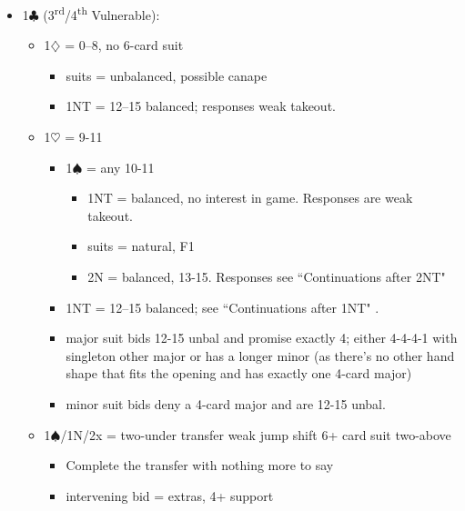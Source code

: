 \documentclass[a4paper,14pt]{extarticle}
\begin{document}
\begin{itemize}
\item 1$\clubsuit$ (3\textsuperscript{rd}/4\textsuperscript{th} Vulnerable):
	\begin{itemize}
   \item 1$\diamondsuit$ = 0--8, no 6-card suit
		\begin{itemize}
      \item suits = unbalanced, possible canape
      \item 1NT = 12--15 balanced; responses weak takeout.
		\end{itemize}
   \item 1$\heartsuit$ = 9-11
		\begin{itemize}
      \item 1$\spadesuit$ = any 10-11
			\begin{itemize}
			\item 1NT = balanced, no interest in game. Responses are weak takeout.
			\item suits = natural, F1
			\item 2N = balanced, 13-15. Responses see ``Continuations after 2NT" 
			\end{itemize}
      \item 1NT = 12--15 balanced; see ``Continuations after 1NT" .
      \item major suit bids 12-15 unbal and promise exactly 4; either 4-4-4-1
            with singleton other major or has a longer minor (as there's no other
            hand shape that fits the opening and has exactly one 4-card major)
      \item minor suit bids deny a 4-card major and are 12-15 unbal.
		\end{itemize}
   \item 1$\spadesuit$/1N/2x = two-under transfer weak jump shift 6+ card suit two-above
		\begin{itemize}
		\item Complete the transfer with nothing more to say
		\item intervening bid = extras, 4+ support
		\end{itemize}
	\end{itemize}

\newpage


\end{itemize}
\end{document}
